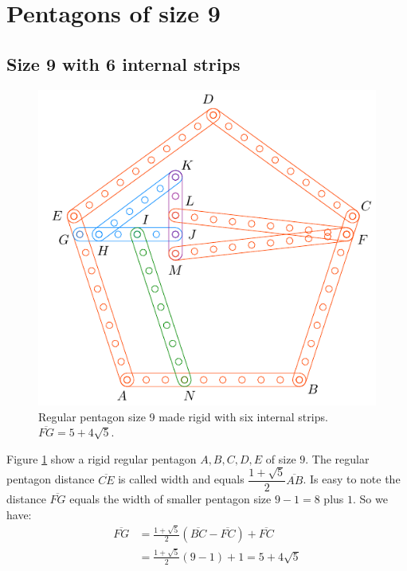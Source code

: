 \documentclass[11pt]{article}
\begin{document}

\section{Pentagons of size 9}

\subsection{Size 9 with 6 internal strips}

\begin{figure}[h]
 \centering
 \includegraphics[scale=0.95]{9/penta9a}
 \caption{Regular pentagon size 9 made rigid with six internal strips. $\overline{FG}=5+4\sqrt5$. }
 \label{fig:penta9a}
\end{figure}

Figure \ref{fig:penta9a} show a rigid regular pentagon $A,B,C,D,E$ of size $9$. The regular pentagon distance $\overline{CE}$ is called width and equals $\dfrac{1+\sqrt5}{2}\overline{AB}$. Is easy to note the distance $\overline{FG}$ equals the width of smaller pentagon size $9-1=8$ plus $1$. So we have:
\begin{align}
\overline{FG} &= \frac{1+\sqrt5}{2}(\overline{BC}-\overline{FC}) + \overline{FC}\nonumber\\
 &= \frac{1+\sqrt5}{2}(9-1) + 1 = 5 + 4\sqrt5
\end{align}
\end{document}
